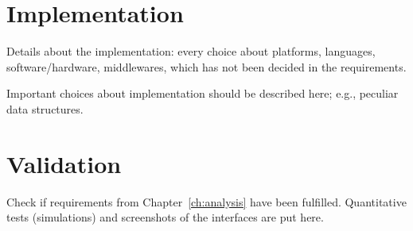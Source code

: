 \documentclass{memoir}
\begin{document}
%
%
%
%
%

\chapter{Implementation}

Details about the implementation: every choice about platforms, languages, software/hardware, middlewares, which has not been decided in the requirements.


Important choices about implementation should be described here; e.g., peculiar data structures.


\chapter{Validation}

Check if requirements from Chapter~\ref{ch:analysis} have been fulfilled.
Quantitative tests (simulations) and screenshots of the interfaces are put here.
\end{document}
